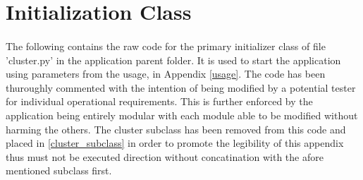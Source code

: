 \section{Initialization Class}
\label{cluster.py}
\paragraph{}The following contains the raw code for the primary initializer class of file  'cluster.py' in the application parent folder. It is used to start the application using parameters from the usage, in Appendix \ref{usage}.  The code has been thuroughly commented with the intention of being modified by a potential tester for individual operational requirements. This is further enforced by the application being entirely modular with each module able to be modified without harming the others. The cluster subclass has been removed from this code and placed in \ref{cluster_subclass} in order to promote the legibility of this appendix thus must not be executed direction without concatination with the afore mentioned subclass first.
